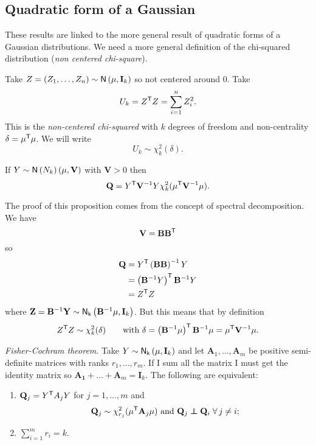 \documentclass[12pt]{report}
\begin{document}
\subsection{Quadratic form of a Gaussian}
These results are linked to the more general result of quadratic forms of a Gaussian distributions. We need a more general definition of the chi-squared distribution (\emph{non centered chi-square}). \begin{definition}
	Take $Z=(Z_{1},\ldots,Z_{n})\sim\mathsf{N}\left(\mu,\mathbf{I}_{k}\right)$ so not centered around 0. Take $$U_{k}=Z^{\mathsf{T}}Z=\sum_{i=1}^{n}Z_{i}^{2}.$$
This is the \emph{non-centered chi-squared \rv{}} with $k$ degrees of freedom and non-centrality $\delta=\mu^{\mathsf{T}}\mu$. We will write
\begin{equation*}
	U_{k}\sim\chi^{2}_{k}(\delta).
\end{equation*}
\end{definition}
\begin{proposition}
	If $Y\sim\mathsf{N}\left(N_{k}\right)(\mu,\mathbf{V})$ with $\mathbf{V}>0$ then
	\begin{equation*}
		\mathbf{Q}=Y^{\mathsf{T}}\mathbf{V}^{-1}Y\chi^{2}_{k}(\mu^{\mathsf{T}}\mathbf{V}^{-1}\mu).
	\end{equation*}
\end{proposition}
\begin{fancyproof}
	The proof of this proposition comes from the concept of spectral decomposition. We have
	\begin{equation*}
		\mathbf{V}=\mathbf{BB^{\mathsf{T}}}
	\end{equation*}
	so
	\begin{align*}
		\mathbf{Q}&=Y^{\mathsf{T}}\left(\mathbf{BB}\right)^{-1}Y\\
		&=\left(\mathbf{B}^{-1}Y\right)^{\mathsf{T}}\mathbf{B}^{-1}Y\\
		&=Z^{\mathsf{T}}Z
	\end{align*}
	where $\mathbf{Z}=\mathbf{B}^{-1}\mathbf{Y}\sim\mathsf{N}_{\mathsf{k}}\left(\mathbf{B}^{-1}\mu,\mathbf{I}_{k}\right)$. But this means that by definition
	\begin{equation*}
		Z^{\mathsf{T}}Z\sim\chi^{2}_{k}(\delta)\qquad\text{with }\delta=\left(\mathbf{B}^{-1}\mu\right)^{\mathsf{T}}\mathbf{B}^{-1}\mu=\mu^{\mathsf{T}}\mathbf{V}^{-1}\mu.
	\end{equation*}
\end{fancyproof}
\begin{theorem}
	\emph{Fisher-Cochram theorem}.  Take $Y\sim\mathsf{N}_{\mathsf{k}}\left(\mu,\mathbf{I}_k\right)$ and let $\mathbf{A}_{1},\ldots,\mathbf{A}_{m}$ be positive semi-definite matrices with ranks $r_{1},\ldots,r_{m}$. If I sum all the matrix I must get the identity matrix so $\mathbf{A_{1}}+\ldots+\mathbf{A}_{m}=\mathbf{I}_{k}$. The following are equivalent:
	\begin{enumerate}
		\item $\mathbf{Q}_{j}=Y^{\mathsf{T}}A_{j}Y$ for $j=1,\ldots,m$ and 
		\begin{equation*}
			\mathbf{Q}_{j}\sim\chi^{2}_{r_{j}}(\mu^{\trsp}\mathbf{A}_{j}\mu)\text{ and }\mathbf{Q}_{j}\indep\mathbf{Q}_{i}\;\every j\neq i;
		\end{equation*}
		\item $\sum_{i=1}^{m}r_{i}=k$.
	\end{enumerate} 
\end{theorem}
\end{document}
